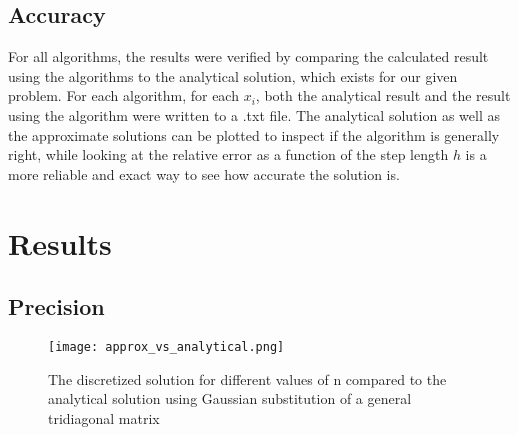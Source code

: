 \documentclass[10pt,a4paper]{article}
\begin{document}
\subsection{Accuracy}
For all algorithms, the results were verified by comparing the calculated result using the algorithms to the analytical solution, which exists for our given problem. For each algorithm, for each $x_i$, both the analytical result and the result using the algorithm were written to a .txt file. The analytical solution as well as the approximate solutions can be plotted to inspect if the algorithm is generally right, while looking at the relative error as a function of the step length $h$ is a more reliable and exact way to see how accurate the solution is. 
\section{Results}

\subsection{Precision}

\begin{figure}[H]
	\texttt{[image: approx\_vs\_analytical.png]}
	\caption[Precision of the generalized algorithm]{The discretized solution for different values of n compared to the analytical solution using Gaussian substitution of a general tridiagonal matrix}
\end{figure}
\end{document}
